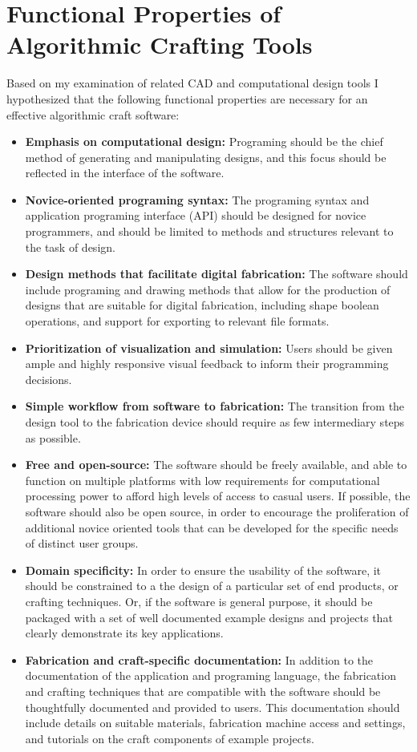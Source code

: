 	\section{Functional Properties of Algorithmic Crafting Tools}
	Based on my examination of related CAD and computational design tools I hypothesized that the following functional properties are necessary for an effective algorithmic craft software:
	\begin{itemize}
\item \textbf{Emphasis on computational design:} Programing should be the chief method of generating and manipulating designs, and this focus should be reflected in the interface of the software. 
\item \textbf{ Novice-oriented programing syntax:} The programing syntax and application programing interface (API) should be designed for novice programmers, and should be limited to methods and structures relevant to the task of design. 
\item \textbf {Design methods that facilitate digital fabrication:} The software should include programing and drawing methods that allow for the production of designs that are suitable for digital fabrication, including shape boolean operations, and support for exporting to relevant file formats. 
\item \textbf{ Prioritization of visualization and simulation:} Users  should be given ample and highly responsive visual feedback to inform their programming decisions.
\item \textbf{ Simple workflow from software to fabrication:} The transition from the design tool to the fabrication device should require as few intermediary steps as possible.
\item \textbf{ Free and open-source:} The software should be freely available, and able to function on multiple platforms with low requirements for computational processing power to afford high levels of access to casual users. If possible, the software should also be open source, in order to encourage the proliferation of additional novice oriented tools that can be developed for the specific needs of distinct user groups.
\item \textbf{Domain specificity:} In order to ensure the usability of the software, it should be constrained to a the design of a particular set of end products, or crafting techniques. Or, if the software is general purpose, it should be packaged with a set of well documented example designs and projects that clearly demonstrate its key applications. 
\item \textbf{Fabrication and craft-specific documentation:} In addition to the documentation of the application and programing language, the fabrication and crafting techniques that are compatible with the software should be thoughtfully documented and provided to users. This documentation should include details on suitable materials, fabrication machine access and settings, and tutorials on the craft components of example projects.
\end{itemize}

